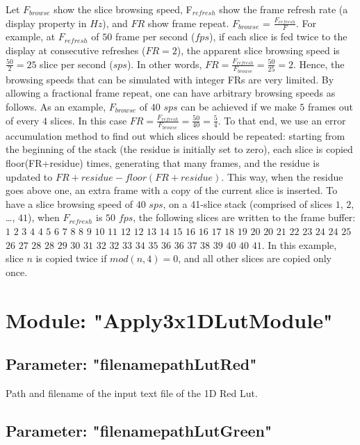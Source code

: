 Let $F_{browse}$ show the slice browsing speed, F$_{refresh}$ show the frame refresh rate (a display property in $Hz$), and $FR$ show frame repeat. $F_{browse}$ = $\frac{F_{refresh}}{F}$. For example, at $F_{refresh}$ of $50$ frame per second ($fps$), if each slice is fed twice to the display at consecutive refreshes ($FR = 2$), the apparent slice browsing speed is $\frac{50}{2} = 25$ slice per second ($sps$). In other words, $FR = \frac{F_{refresh}}{F_{browse}} = \frac{50}{25} = 2$. Hence, the browsing speeds that can be simulated with integer FRs are very limited. By allowing a fractional frame repeat, one can have arbitrary browsing speeds as follows. As an example, $F_{browse}$ of $40$ $sps$ can be achieved if we make $5$ frames out of every $4$ slices. In this case $FR = \frac{F_{refresh}}{F_{browse}} = \frac{50}{40} = \frac{5}{4}$. To that end, we use an error accumulation method to find out which slices should be repeated: starting from the beginning of the stack (the residue is initially set to zero), each slice is copied floor(FR+residue) times, generating that many frames, and the residue is updated to $FR+residue-floor(FR+residue)$. This way, when the residue goes above one, an extra frame with a copy of the current slice is inserted. To have a slice browsing speed of $40$ $sps$, on a 41-slice stack (comprised of slices $1$, $2$, \ldots{}, $41$), when $F_{refresh}$ is $50$ $fps$, the following slices are written to the frame buffer: $1$ $2$ $3$ $4$ $4$ $5$ $6$ $7$ $8$ $8$ $9$ $10$ $11$ $12$ $12$ $13$ $14$ $15$ $16$ $16$ $17$ $18$ $19$ $20$ $20$ $21$ $22$ $23$ $24$ $24$ $25$ $26$ $27$ $28$ $28$ $29$ $30$ $31$ $32$ $32$ $33$ $34$ $35$ $36$ $36$ $37$ $38$ $39$ $40$ $40$ $41$. In this example, slice $n$ is copied twice if $mod(n, 4) = 0$, and all other slices are copied only once.

\section{Module: "Apply3x1DLutModule"}

\subsection{Parameter: "filenamepathLutRed"}

Path and filename of the input text file of the 1D Red Lut.

\subsection{Parameter: "filenamepathLutGreen"}

